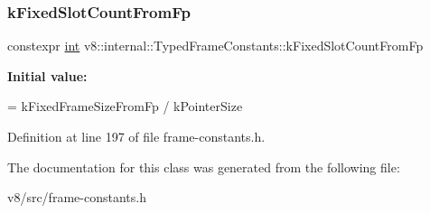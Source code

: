 \subsubsection{\texorpdfstring{k\+Fixed\+Slot\+Count\+From\+Fp}{kFixedSlotCountFromFp}}
{\footnotesize\ttfamily constexpr \mbox{\hyperlink{classint}{int}} v8\+::internal\+::\+Typed\+Frame\+Constants\+::k\+Fixed\+Slot\+Count\+From\+Fp\hspace{0.3cm}{\ttfamily [static]}}

{\bfseries Initial value\+:}
\begin{DoxyCode}
=
      kFixedFrameSizeFromFp / kPointerSize
\end{DoxyCode}


Definition at line 197 of file frame-\/constants.\+h.



The documentation for this class was generated from the following file\+:\begin{DoxyCompactItemize}
\item 
v8/src/frame-\/constants.\+h\end{DoxyCompactItemize}
